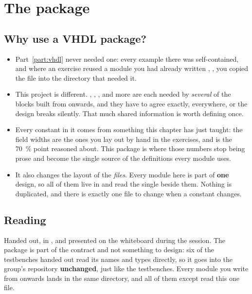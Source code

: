 
\section{The  package}
\label{c10:sec:candef}

\subsection*{Why use a VHDL package?}
\begin{itemize}
  \item Part~\ref{part:vhdl} never needed one: every example there was self-contained, and where an
    exercise reused a module you had already written \textemdash{} ,
    ,  \textemdash{} you copied the file into the directory that
    needed it.
  \item This project is different. , , ,
     and more are each needed by \emph{several} of the blocks built from
     onwards, and they have to agree exactly, everywhere, or the design breaks
    silently. That much shared information is worth defining once.
  \item Every constant in it comes from something this chapter has just taught: the field widths are
    the ones you lay out by hand in the exercises, and  is the 70~\% point
     reasoned about. This package is where those numbers stop being prose
    and become the single source of the definitions every module uses.
  \item It also changes the layout of the \emph{files}. Every module here is part of \textbf{one}
    design, so all of them live in  and read the single  beside
    them. Nothing is duplicated, and there is exactly one file to change when a constant changes.
\end{itemize}

\subsection*{Reading }
Handed out, in , and presented on the whiteboard during the session.
The package is part of the contract and not something to design: six of the testbenches handed out
read its names and types directly, so it goes into the group's repository \textbf{unchanged}, just
like the testbenches. Every module you write from  onwards lands in the same
directory, and all of them except  read this one file.

